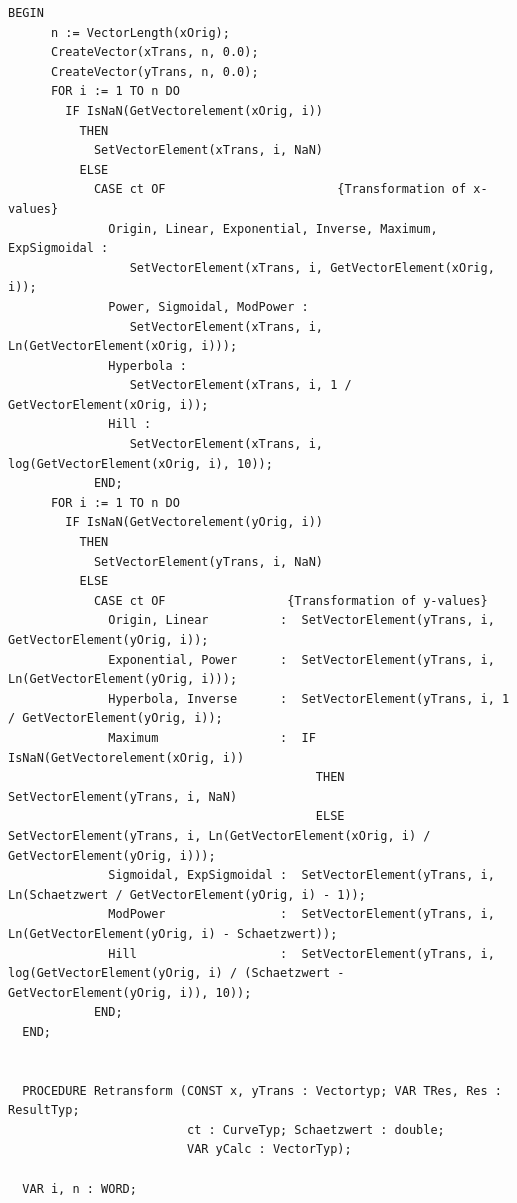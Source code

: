 \begin{refsection}
\begin{lstlisting}[caption=Linearisation of curved data]
  BEGIN
      n := VectorLength(xOrig);
      CreateVector(xTrans, n, 0.0);
      CreateVector(yTrans, n, 0.0);
      FOR i := 1 TO n DO
        IF IsNaN(GetVectorelement(xOrig, i))
          THEN
            SetVectorElement(xTrans, i, NaN)
          ELSE
            CASE ct OF                        {Transformation of x-values}
              Origin, Linear, Exponential, Inverse, Maximum, ExpSigmoidal :
                 SetVectorElement(xTrans, i, GetVectorElement(xOrig, i));
              Power, Sigmoidal, ModPower :
                 SetVectorElement(xTrans, i, Ln(GetVectorElement(xOrig, i)));
              Hyperbola :
                 SetVectorElement(xTrans, i, 1 / GetVectorElement(xOrig, i));
              Hill :
                 SetVectorElement(xTrans, i, log(GetVectorElement(xOrig, i), 10));
            END;
      FOR i := 1 TO n DO
        IF IsNaN(GetVectorelement(yOrig, i))
          THEN
            SetVectorElement(yTrans, i, NaN)
          ELSE
            CASE ct OF                 {Transformation of y-values}
              Origin, Linear          :  SetVectorElement(yTrans, i, GetVectorElement(yOrig, i));
              Exponential, Power      :  SetVectorElement(yTrans, i, Ln(GetVectorElement(yOrig, i)));
              Hyperbola, Inverse      :  SetVectorElement(yTrans, i, 1 / GetVectorElement(yOrig, i));
              Maximum                 :  IF IsNaN(GetVectorelement(xOrig, i))
                                           THEN SetVectorElement(yTrans, i, NaN)
                                           ELSE SetVectorElement(yTrans, i, Ln(GetVectorElement(xOrig, i) / GetVectorElement(yOrig, i)));
              Sigmoidal, ExpSigmoidal :  SetVectorElement(yTrans, i, Ln(Schaetzwert / GetVectorElement(yOrig, i) - 1));
              ModPower                :  SetVectorElement(yTrans, i, Ln(GetVectorElement(yOrig, i) - Schaetzwert));
              Hill                    :  SetVectorElement(yTrans, i, log(GetVectorElement(yOrig, i) / (Schaetzwert - GetVectorElement(yOrig, i)), 10));
            END;
  END;


  PROCEDURE Retransform (CONST x, yTrans : Vectortyp; VAR TRes, Res : ResultTyp;
                         ct : CurveTyp; Schaetzwert : double;
                         VAR yCalc : VectorTyp);

  VAR i, n : WORD;


\end{lstlisting}
\end{refsection}
